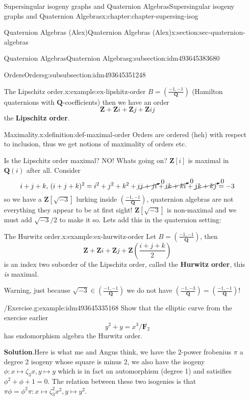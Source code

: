 \documentclass[oneside,10pt,]{book}
\newcommand{\terminology}[1]{\textbf{#1}}
\numberwithin{equation}{section}
\newcommand{\legendre}[2]{\left(\frac{#1}{#2}\right)}
\newcommand{\lb}{[}
\newcommand{\rb}{]}
\newcommand{\ZZ}{\mathbf{Z}}
\newcommand{\QQ}{\mathbf{Q}}
\newcommand{\FF}{\mathbf{F}}
\begin{document}
\begin{chapterptx}{Supersingular isogeny graphs and Quaternion Algebras}{}{Supersingular isogeny graphs and Quaternion Algebras}{}{}{x:chapter:chapter-supersing-isog}
\begin{sectionptx}{Quaternion Algebras (Alex)}{}{Quaternion Algebras (Alex)}{}{}{x:section:sec-quaternion-algebras}
\begin{subsectionptx}{Quaternion Algebras}{}{Quaternion Algebras}{}{}{g:subsection:idm493645383680}
\begin{subsubsectionptx}{Orders}{}{Orders}{}{}{g:subsubsection:idm493645351248}
\begin{example}{The Lipschitz order.}{x:example:ex-lipshitz-order}
\(B = \legendre{-1,-1}{\QQ}\) (Hamilton quaternions with \(\QQ\)-coefficients) then we have an order%
\begin{equation*}
\ZZ + \ZZ i + \ZZ j + \ZZ ij
\end{equation*}
the \terminology{Lipschitz order}.%
\end{example}
\begin{definition}{Maximality.}{x:definition:def-maximal-order}%
Orders are ordered (heh) with respect to inclusion, thus we get notions of maximality of orders etc.%
\end{definition}
Is the Lipschitz order maximal? NO! Whats going on? \(\ZZ\lb i\rb\) is maximal in \(\QQ(i)\) after all. Consider%
\begin{equation*}
i + j + k,\,(i+j + k)^2 = i^2 + j^2 + k^2 + \cancelto{0}{ij + ji} + \cancelto{0}{ik + ki} + \cancelto{0}{jk + kj} = -3
\end{equation*}
so we have a \(\ZZ\lb \sqrt{-3}\rb\) lurking inside \(\legendre{-1,-1}{\QQ}\), quaternion algebras are not everything they appear to be at first sight! \(\ZZ\lb \sqrt{-3}\rb\) is non-maximal and we must add \(\sqrt{-3}/2\) to make it so. Lets add this in the quaternion setting:%
\begin{example}{The Hurwitz order.}{x:example:ex-hurwitz-order}%
Let \(B = \legendre{-1,-1}{\QQ}\), then%
\begin{equation*}
\ZZ+  \ZZ i + \ZZ j + \ZZ \left(\frac{i + j + k}{2}\right)
\end{equation*}
is an index two suborder of the Lipschitz order, called the \terminology{Hurwitz order}, this \emph{is} maximal.%
\end{example}
Warning, just because \(\sqrt{-3} \in \legendre{-1,-1}{\QQ}\) we do not have \(\legendre{-1,-3}{\QQ} = \legendre{-1,-1}{\QQ}\)!%
\begin{example}{\slash{}Exercise.}{g:example:idm493645335168}%
Show that the elliptic curve from the exercise earlier%
\begin{equation*}
y^2 + y = x^3/\overline{\FF_2}
\end{equation*}
has endomorphism algebra the Hurwitz order.%
\par\smallskip%
\noindent\textbf{Solution}.\hypertarget{g:solution:idm493645333856}{}\quad{}Here is what me and Angus think, we have the 2-power frobenius \(\pi\) a degree 2 isogeny whose square is minus 2, we also have the isogeny \(\phi \colon x\mapsto \zeta_3 x, y\mapsto y\) which is in fact an automorphism (degree 1) and satisifies \(\phi^2 + \phi + 1 = 0\). The relation between these two isogenies is that \(\pi \phi  = \phi^2 \pi \colon x\mapsto \zeta_3^2 x^2, y\mapsto y^2\).%

\end{example}
\end{subsubsectionptx}
\end{subsectionptx}
\end{sectionptx}
\end{chapterptx}
\end{document}
